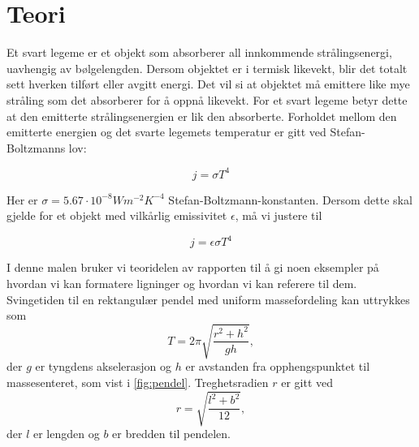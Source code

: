\section{Teori}
Et svart legeme er et objekt som absorberer all innkommende strålingsenergi, uavhengig av bølgelengden. Dersom objektet er i termisk likevekt, blir det totalt sett hverken tilført eller avgitt energi. Det vil si at objektet må emittere like mye stråling som det absorberer for å oppnå likevekt. For et svart legeme betyr dette at den emitterte strålingsenergien er lik den absorberte. Forholdet mellom den emitterte energien og det svarte legemets temperatur er gitt ved Stefan-Boltzmanns lov:

\begin{equation}
  j = \sigma T^4
\label{eq:SB} %
\end{equation}

Her er $\sigma = 5.67\cdot 10^{-8}Wm^{-2}K^{-4}$ Stefan-Boltzmann-konstanten. Dersom dette skal gjelde for et objekt med vilkårlig emissivitet $\epsilon$, må vi justere til

\begin{equation}
  j = \epsilon\sigma T^4
\label{eq:SBepsilon} %
\end{equation}

I denne malen bruker vi teoridelen av rapporten til å gi noen eksempler på hvordan vi kan formatere ligninger og hvordan vi kan referere til dem. Svingetiden til en rektangulær pendel med uniform massefordeling kan uttrykkes som 
\begin{equation}
T=2\pi\sqrt{\frac{r^2+h^2}{gh}},
\label{eq:svingetid} %
\end{equation}
der $g$ er tyngdens akselerasjon og $h$ er avstanden fra opphengspunktet til massesenteret, som vist i \autoref{fig:pendel}. Treghetsradien $r$ er gitt ved
\begin{equation}
r=\sqrt{\frac{l^2+b^2}{12}},
\label{eq:treghetsradius}
\end{equation}
der $l$ er lengden og $b$ er bredden til pendelen.


